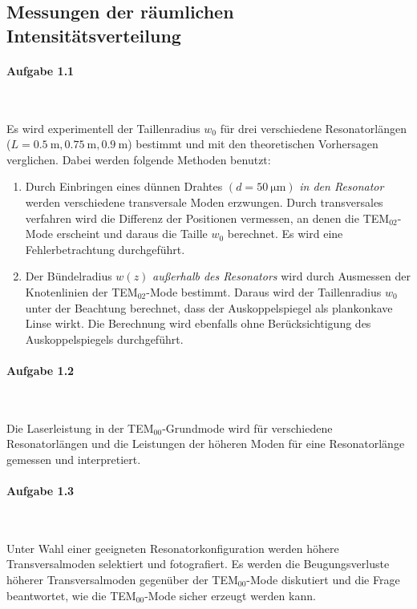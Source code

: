 \documentclass[a4paper,twoside,final]{article}
\begin{document}
\subsection{Messungen der räumlichen Intensitätsverteilung}

\paragraph{Aufgabe 1.1}$~$

Es wird experimentell der Taillenradius $w_0$ für drei verschiedene Resonatorlängen ($L= \SI{0.5}{\metre}, \SI{0.75}{\metre}, \SI{0.9}{\metre}$) bestimmt und mit den theoretischen Vorhersagen verglichen. Dabei werden folgende Methoden benutzt:
\begin{enumerate}
  \item Durch Einbringen eines dünnen Drahtes $(d =\SI{50}{\micro\metre})$ \emph{in den Resonator} werden verschiedene transversale Moden erzwungen. Durch transversales verfahren wird die Differenz der Positionen vermessen, an denen die TEM$_{02}$-Mode erscheint und daraus die Taille $w_0$ berechnet. Es wird eine Fehlerbetrachtung durchgeführt.
  \item Der Bündelradius $w(z)$ \emph{außerhalb des Resonators} wird durch Ausmessen der Knotenlinien der TEM$_{02}$-Mode bestimmt. Daraus wird der Taillenradius $w_0$ unter der Beachtung berechnet, dass der Auskoppelspiegel als plankonkave Linse wirkt. Die Berechnung wird ebenfalls ohne Berücksichtigung des Auskoppelspiegels durchgeführt.
\end{enumerate}

\paragraph{Aufgabe 1.2}$~$

Die Laserleistung in der TEM$_{00}$-Grundmode wird für verschiedene Resonatorlängen und die Leistungen der höheren Moden für eine Resonatorlänge gemessen und interpretiert.

\paragraph{Aufgabe 1.3}$~$

Unter Wahl einer geeigneten Resonatorkonfiguration werden höhere Transversalmoden selektiert und fotografiert. Es werden die Beugungsverluste höherer Transversalmoden gegenüber der TEM$_{00}$-Mode diskutiert und die Frage beantwortet, wie die TEM$_{00}$-Mode sicher erzeugt werden kann.
\end{document}
